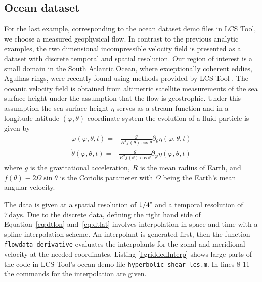 \documentclass{article}
\begin{document}
\clearpage

\subsection{Ocean dataset}
\label{sec:oceandataset}

For the last example, corresponding to the ocean dataset demo files in LCS Tool, we choose a measured geophysical flow. In contrast to the previous analytic examples, the two dimensional incompressible velocity field is presented as a dataset with discrete temporal and spatial resolution. Our region of interest is a small domain in the South Atlantic Ocean, where exceptionally coherent eddies, Agulhas rings, were recently found using methods provided by LCS Tool \parencite{haller13:_coher_lagran}. The oceanic velocity field is obtained from altimetric satellite measurements of the sea surface height under the assumption that the flow is geostrophic. Under this assumption the sea surface height $\eta$ serves as a stream-function and in a longitude-latitude $(\varphi,\theta)$ coordinate system the evolution of a fluid particle is given by
\begin{eqnarray}
\dot{\varphi}(\varphi,\theta,t) = -\frac{g}{R^2 f(\theta) \cos\theta}\partial_{\theta}\eta(\varphi,\theta,t)\label{eq:dtlon}\\
\dot{\theta}(\varphi,\theta,t) = +\frac{g}{R^2 f(\theta) \cos\theta}\partial_{\varphi}\eta(\varphi,\theta,t)
\label{eq:dtlat}
\end{eqnarray}
where $g$ is the gravitational acceleration, $R$ is the mean radius of Earth, and $f(\theta) \equiv 2\Omega\sin\theta$ is the Coriolis parameter with $\Omega$ being the Earth's mean angular velocity. 

The data is given at a spatial resolution of $1/4\degree$ and a temporal resolution of $7\,\mathrm{days}$. Due to the discrete data, defining the right hand side of Equation~\eqref{eq:dtlon} and~\eqref{eq:dtlat} involves interpolation in space and time with a spline interpolation scheme. An interpolant is generated first, then the function \lstinline!flowdata_derivative! evaluates the interpolants for the zonal and meridional velocity at the needed coordinates. Listing \ref{l:griddedInterp} shows large parts of the code in LCS Tool's ocean demo file \lstinline!hyperbolic_shear_lcs.m!. In lines 8-11 the commands for the interpolation are given.
\end{document}

